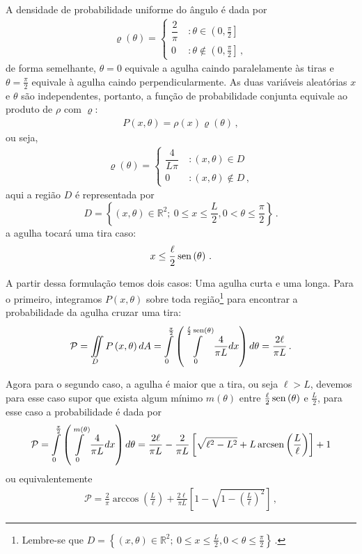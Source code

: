 \documentclass[18pt]{article}
\begin{document}
A densidade de probabilidade uniforme do ângulo é dada por
\begin{align}
\varrho\left(\theta\right)=\begin{cases}
\dfrac{2}{\pi}~&:\theta\in\left(0,\frac{\pi}{2}\right]\\
0~&:\theta\notin \left(0,\frac{\pi}{2}\right]\,,
\end{cases}
\end{align}
de forma semelhante, $\theta=0$ equivale a agulha caindo paralelamente às tiras e $\theta=\frac{\pi}{2}$ equivale à agulha caindo perpendicularmente. As duas variáveis aleatórias $x$ e $\theta$ são independentes, portanto, a função de probabilidade conjunta equivale ao produto de $\rho$ com $\varrho$:
\begin{align*}
P\left(x,\theta\right)=\rho\left(x\right)\varrho\left(\theta\right)\,,
\end{align*}
ou seja,
\begin{align}
\varrho\left(\theta\right)=\begin{cases}
\dfrac{4}{L\pi}~&:\left(x,\theta\right)\in D\\
0~&:\left(x,\theta\right)\notin D\,,
\end{cases}
\end{align}
aqui a região $D$ é representada por $$D=\left\{\left(x,\theta\right)\in\mathbb{R}^2;~0\leq x\leq \frac{L}{2}, 0< \theta\leq \frac{\pi}{2}\right\}\,.$$
a agulha tocará uma tira caso:
\begin{align*}
x\leq \frac{\ell}{2}\operatorname{sen}\left(\theta\right)\,.
\end{align*}

A partir dessa formulação temos dois casos: Uma agulha curta e uma longa. Para o primeiro, integramos $P\left(x,\theta\right)$ sobre toda região\footnote{Lembre-se que $D=\left\{\left(x,\theta\right)\in\mathbb{R}^2;~0\leq x\leq \frac{L}{2}, 0< \theta\leq \frac{\pi}{2}\right\}\,.$} para encontrar a probabilidade da agulha cruzar uma tira:
\begin{align}\label{eq5}
\mathcal{P}=\iint\limits_{D}P\left(x,\theta\right)dA=\int\limits_{0}^{\frac{\pi}{2}}\left(\int\limits_{0}^{\frac{\ell}{2}\operatorname{sen}\left(\theta\right)}\frac{4}{\pi L}dx\right)d\theta=\frac{2\ell}{\pi L}\,.
\end{align}

Agora para o segundo caso, a agulha é maior que a tira, ou seja $\ell > L$, devemos para esse caso supor que exista algum mínimo $m\left(\theta\right)$ entre $\frac{\ell}{2}\operatorname{sen}\left(\theta\right)$ e $\frac{L}{2}$, para esse caso a probabilidade é dada por
\begin{align}
\mathcal{P}=\int\limits_{0}^{\frac{\pi}{2}}\left(\int\limits_{0}^{m\left(\theta\right)}\frac{4}{\pi L}dx\right)d\theta=\frac{2\ell}{\pi L}-\frac{2}{\pi L}\left[\sqrt{\ell^2-L^2}+L \operatorname{arcsen}\left(\frac{L}{\ell}\right)\right]+1
\end{align}
ou equivalentemente
\begin{align}
\mathcal{P}=\frac{2}{\pi}\arccos\left(\frac{L}{\ell}\right)+\frac{2\ell}{\pi L}\left[1-\sqrt{1-\left(\frac{L}{\ell}\right)^2}\right]\,,
\end{align}
\end{document}
